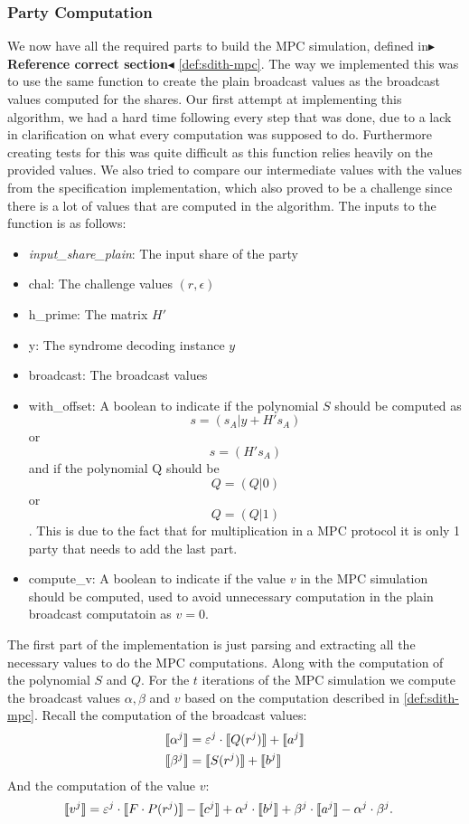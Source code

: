 \documentclass[11pt]{report}
\theoremstyle{definition}
\theoremstyle{plain}
\newcommand{\todo}[1]{{\color[rgb]{.5,0,0}\textbf{$\blacktriangleright$#1$\blacktriangleleft$}}}
\begin{document}
\subsubsection{Party Computation}
We now have all the required parts to build the MPC simulation, defined in\todo{Reference correct section} \autoref{def:sdith-mpc}. The way we implemented this was to use the same function to create the plain broadcast values as the broadcast values computed for the shares. Our first attempt at implementing this algorithm, we had a hard time following every step that was done, due to a lack in clarification on what every computation was supposed to do. Furthermore creating tests for this was quite difficult as this function relies heavily on the provided values. We also tried to compare our intermediate values with the values from the specification implementation, which also proved to be a challenge since there is a lot of values that are computed in the algorithm. 
The inputs to the function is as follows:
\begin{itemize}
  \item \textit{input\_share\_plain}: The input share of the party
  \item chal: The challenge values $(r, \epsilon)$
  \item h\_prime: The matrix $H'$
  \item y: The syndrome decoding instance $y$ 
  \item broadcast: The broadcast values
  \item with\_offset: A boolean to indicate if the polynomial $S$ should be computed as $$s = (s_A|y+H's_A)$$ or $$s = (H's_A)$$ and if the polynomial Q should be $$Q = (Q|0)$$ or $$Q = (Q|1)$$. This is due to the fact that for multiplication in a MPC protocol it is only 1 party that needs to add the last part. 
  \item compute\_v: A boolean to indicate if the value $v$ in the MPC simulation should be computed, used to avoid unnecessary computation in the plain broadcast computatoin as $v = 0$.
\end{itemize}
The first part of the implementation is just parsing and extracting all the necessary values to do the MPC computations. Along with the computation of the polynomial $S$ and $Q$.
For the $t$ iterations of the MPC simulation we compute the broadcast values $\alpha, \beta$ and $v$ based on the computation described in \autoref{def:sdith-mpc}.
Recall the computation of the broadcast values:
\begin{align*}
  \llbracket \alpha^j \rrbracket  &= \varepsilon^j \cdot \llbracket Q(r^j) \rrbracket + \llbracket a^j \rrbracket\\
  \llbracket \beta^j \rrbracket  &= \llbracket S(r^j) \rrbracket + \llbracket b^j \rrbracket\\
\end{align*}
And the computation of the value $v$:
\begin{align*}
  \llbracket v^j \rrbracket & = \varepsilon^j \cdot \llbracket F \cdot P(r^j) \rrbracket - \llbracket c^j \rrbracket + \alpha^j \cdot \llbracket b^j \rrbracket + \beta^j \cdot \llbracket a^j \rrbracket - \alpha^j \cdot \beta^j.
\end{align*}
\end{document}
